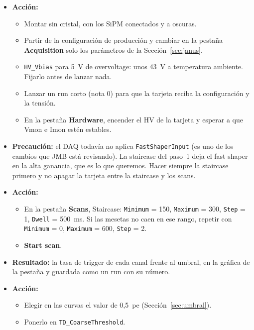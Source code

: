 \documentclass[11pt,a4paper]{article}
\begin{document}
\begin{itemize}
\item {\bf Acción:}
  \begin{itemize}
  \item Montar sin cristal, con los SiPM conectados y a oscuras.
  \item Partir de la configuración de producción y cambiar en la pestaña
    {\bf Acquisition} solo los parámetros de la Sección~\ref{sec:janus}.
  \item \texttt{HV\_Vbias} para 5~V de overvoltage: unos 43~V a temperatura
    ambiente. Fijarlo antes de lanzar nada.
  \item Lanzar un run corto (nota 0) para que la tarjeta reciba la
    configuración y la tensión.
  \item En la pestaña {\bf Hardware}, encender el HV de la tarjeta y esperar
    a que Vmon e Imon estén estables.
  \end{itemize}
\item {\bf Precaución:} el DAQ todavía no aplica \texttt{FastShaperInput}
  (es uno de los cambios que JMB está revisando). La staircase del paso~1
  deja el fast shaper en la alta ganancia, que es lo que queremos. Hacer
  siempre la staircase primero y no apagar la tarjeta entre la staircase y
  los scans.
\end{itemize}

\begin{itemize}
\item {\bf Acción:}
  \begin{itemize}
  \item En la pestaña {\bf Scans}, Staircase: \texttt{Minimum} = 150,
    \texttt{Maximum} = 300, \texttt{Step} = 1, \texttt{Dwell} = 500~ms. Si
    las mesetas no caen en ese rango, repetir con \texttt{Minimum} = 0,
    \texttt{Maximum} = 600, \texttt{Step} = 2.
  \item {\bf Start scan}.
  \end{itemize}
\item {\bf Resultado:} la tasa de trigger de cada canal frente al umbral, en
  la gráfica de la pestaña y guardada como un run con su número.
\item {\bf Acción:}
  \begin{itemize}
  \item Elegir en las curvas el valor de 0,5~pe (Sección~\ref{sec:umbral}).
  \item Ponerlo en \texttt{TD\_CoarseThreshold}.
  \end{itemize}
\end{itemize}
\end{document}
